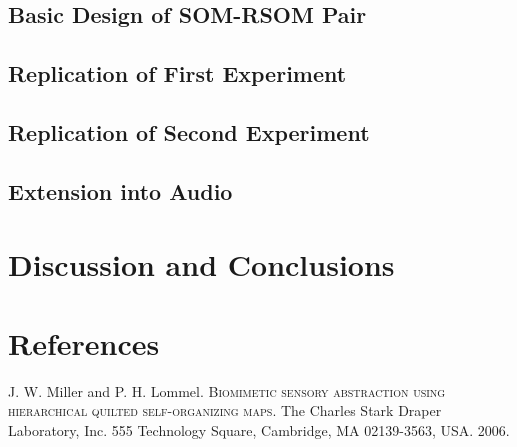 \documentclass[a4paper,10pt]{article}
\begin{document}
\subsection{Basic Design of SOM-RSOM Pair}

\subsection{Replication of First Experiment}
\subsection{Replication of Second Experiment}
\subsection{Extension into Audio}
\section{Discussion and Conclusions}
\section{References}

\begin{thebibliography}{}
 J. W. Miller and P. H. Lommel. \textsc{Biomimetic sensory abstraction using
hierarchical quilted self-organizing maps}. The Charles Stark Draper Laboratory, Inc.
555 Technology Square, Cambridge, MA 02139-3563, USA. 2006.
\end{thebibliography}
\end{document}
